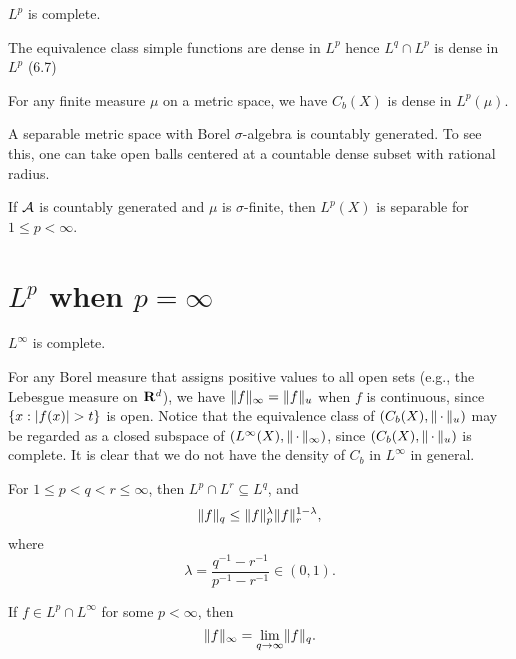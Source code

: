 \begin{thm}
    $L^p$ is complete.
\end{thm}

\begin{prop}
    The equivalence class simple functions are dense in $L^p$ hence $L^q \cap L^p$ is dense in $L^p$ (6.7)
\end{prop}

\begin{prop}
    For any finite measure $\mu$ on a metric space, we have $C_b(X)$ is dense in $L^p(\mu)$. \cite[Proposition~3.16]{Ambrosio_2011}
\end{prop}

A separable metric space with Borel $\sigma$-algebra is countably generated. To see this, one can take open balls centered at a countable dense subset with rational radius.

\begin{thm}
    If $\mathcal{A}$ is countably generated and $\mu$ is $\sigma$-finite, then $L^p(X)$ is separable for $1 \leq p < \infty$. 
\end{thm}

\section{\texorpdfstring{$L^p$}{Lp} when \texorpdfstring{$p = \infty$}{p = infty}}
\begin{thm}
    $L^\infty$ is complete.
\end{thm}

For any Borel measure that assigns positive values to all open sets (e.g., the Lebesgue measure on $\mathbf{R}^d$), we have $\lVert f \rVert_{\infty} = \lVert f \rVert_u$ when $f$ is continuous, since $\{x:\lvert f(x) \rvert > t\}$ is open. Notice that the equivalence class of $(C_b(X),\lVert \,\cdot\, \rVert_u)$ may be regarded as a closed subspace of $(L^\infty(X),\lVert \,\cdot\, \rVert_\infty)$, since $(C_b(X),\lVert \,\cdot\, \rVert_u)$ is complete. It is clear that we do not have the density of $C_b$ in $L^\infty$ in general.

\begin{prop}
    For $1 \leq p < q < r \leq \infty $, then $L^p \cap L^r \subseteq L^q$, and \[
        \lVert f \rVert_q \leq \lVert f \rVert_p^\lambda \lVert f \rVert_r^{1-\lambda},
    \] where \[
        \lambda = \frac{q^{-1} - r^{-1}}{p^{-1} - r^{-1}} \in (0,1).
    \]
\end{prop}

\begin{prop}
    If $f \in L^p \cap L^\infty$ for some $p < \infty$, then \[
        \lVert f \rVert_\infty = \lim_{q \to \infty} \lVert f \rVert_q.
    \]
\end{prop}

